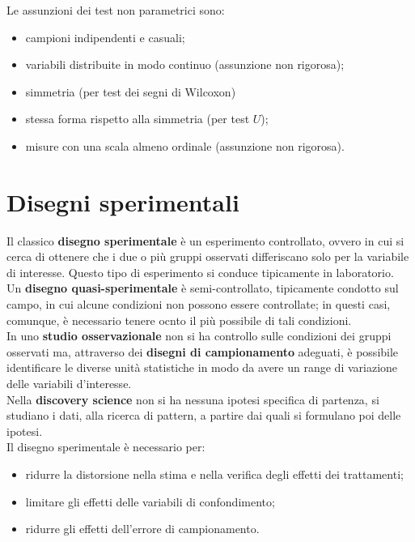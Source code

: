 \documentclass[10pt, draft]{book}
\newcommand{\tightlist}{%
\setlength{\itemsep}{1pt}\setlength{\parskip}{0pt}\setlength{\parsep}{0pt}}
\begin{document}
Le assunzioni dei test non parametrici sono:
\begin{itemize}\tightlist
    \item campioni indipendenti e casuali;
    \item variabili distribuite in modo continuo (assunzione non rigorosa);
    \item simmetria (per test dei segni di Wilcoxon)
    \item stessa forma rispetto alla simmetria (per test $U$);
    \item misure con una scala almeno ordinale (assunzione non rigorosa).
\end{itemize}

\chapter{Disegni sperimentali}

Il classico \textbf{disegno sperimentale} è un esperimento controllato, ovvero in cui si cerca di ottenere che i due o più gruppi osservati differiscano solo per la variabile di interesse. Questo tipo di esperimento si conduce tipicamente in laboratorio.\\
Un \textbf{disegno quasi-sperimentale} è semi-controllato, tipicamente condotto sul campo, in cui alcune condizioni non possono essere controllate; in questi casi, comunque, è necessario tenere ocnto il più possibile di tali condizioni.\\
In uno \textbf{studio osservazionale} non si ha controllo sulle condizioni dei gruppi osservati ma, attraverso dei \textbf{disegni di campionamento} adeguati, è possibile identificare le diverse unità statistiche in modo da avere un range di variazione delle variabili d'interesse.\\
Nella \textbf{discovery science} non si ha nessuna ipotesi specifica di partenza, si studiano i dati, alla ricerca di pattern, a partire dai quali si formulano poi delle ipotesi.\\

Il disegno sperimentale è necessario per:
\begin{itemize}
    \item ridurre la distorsione nella stima e nella verifica degli effetti dei trattamenti;
    \item limitare gli effetti delle variabili di confondimento;
    \item ridurre gli effetti dell'errore di campionamento.
\end{itemize}
\end{document}
